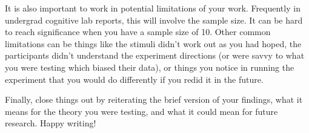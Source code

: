 \documentclass[stu,12pt,floatsintext,a4paper]{apa7}
\begin{document}
It is also important to work in potential limitations of your work. Frequently in undergrad cognitive lab reports, this will involve the sample size. It can be hard to reach significance when you have a sample size of 10. Other common limitations can be things like the stimuli didn't work out as you had hoped, the participants didn't understand the experiment directions (or were savvy to what you were testing which biased their data), or things you notice in running the experiment that you would do differently if you redid it in the future.

Finally, close things out by reiterating the brief version of your findings, what it means for the theory you were testing, and what it could mean for future research. Happy writing!



\printbibliography
\end{document}
